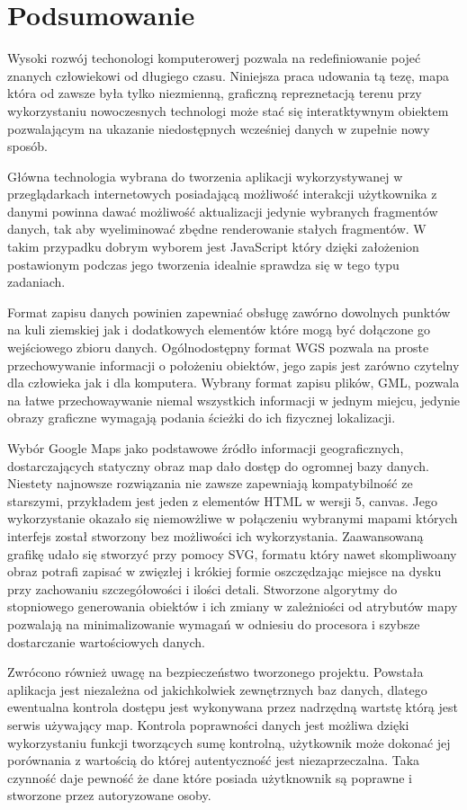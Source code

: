 \chapter{Podsumowanie}

Wysoki rozwój techonologi komputerowerj pozwala na redefiniowanie pojeć znanych człowiekowi od długiego czasu. Niniejsza praca udowania tą tezę, mapa która od zawsze była tylko niezmienną, graficzną repreznetacją terenu przy wykorzystaniu nowoczesnych technologi może stać się interatktywnym obiektem pozwalającym na ukazanie niedostępnych wcześniej danych w zupełnie nowy sposób.

Główna technologia wybrana do tworzenia aplikacji wykorzystywanej w przeglądarkach internetowych posiadającą możliwość interakcji użytkownika z danymi powinna dawać możliwość aktualizacji jedynie wybranych fragmentów danych, tak aby wyeliminować zbędne renderowanie stałych fragmentów. W takim przypadku dobrym wyborem jest JavaScript który dzięki założenion postawionym podczas jego tworzenia idealnie sprawdza się w tego typu zadaniach.

Format zapisu danych powinien zapewniać obsługę zawórno dowolnych punktów na kuli ziemskiej jak i dodatkowych elementów które mogą być dołączone go wejściowego zbioru danych. Ogólnodostępny format WGS pozwala na proste przechowywanie informacji o położeniu obiektów, jego zapis jest zarówno czytelny dla człowieka jak i dla komputera. Wybrany format zapisu plików, GML, pozwala na łatwe przechowaywanie niemal wszystkich informacji w jednym miejcu, jedynie obrazy graficzne wymagają podania ścieżki do ich fizycznej lokalizacji.

Wybór Google Maps jako podstawowe źródło informacji geograficznych, dostarczających statyczny obraz map dało dostęp do ogromnej bazy danych. Niestety najnowsze rozwiązania nie zawsze zapewniają kompatybilność ze starszymi, przykładem jest jeden z elementów HTML w wersji 5, canvas. Jego wykorzystanie okazało się niemowżliwe w połączeniu wybranymi mapami których interfejs został stworzony bez możliwości ich wykorzystania. Zaawansowaną grafikę udało się stworzyć przy pomocy SVG, formatu który nawet skompliwoany obraz potrafi zapisać w zwięzłej i krókiej formie oszczędzając miejsce na dysku przy zachowaniu szczegółowości i ilości detali. Stworzone algorytmy do stopniowego generowania obiektów i ich zmiany w zależniości od atrybutów mapy pozwalają na minimalizowanie wymagań w odniesiu do procesora i szybsze dostarczanie wartościowych danych.

Zwrócono również uwagę na bezpieczeństwo tworzonego projektu. Powstała aplikacja jest niezależna od jakichkolwiek zewnętrznych baz danych, dlatego ewentualna kontrola dostępu jest wykonywana przez nadrzędną wartstę którą jest serwis używający map. Kontrola poprawności danych jest możliwa dzięki wykorzystaniu funkcji tworzących sumę kontrolną, użytkownik może dokonać jej porównania z wartością do której autentyczność jest niezaprzeczalna. Taka czynność daje pewność że dane które posiada użytknownik są poprawne i stworzone przez autoryzowane osoby.

